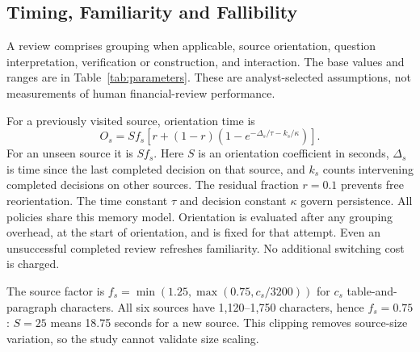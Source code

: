 \documentclass[a4paper,twoside]{article}
\begin{document}
\subsection{Timing, Familiarity and Fallibility}
A review comprises grouping when applicable, source orientation, question interpretation, verification or construction, and interaction. The base values and ranges are in Table~\ref{tab:parameters}. These are analyst-selected assumptions, not measurements of human financial-review performance.

For a previously visited source, orientation time is
\begin{equation}
 O_s = S f_s \left[r+(1-r)\left(1-e^{-\Delta_s/\tau-k_s/\kappa}\right)\right].
 \label{eq:orientation}
\end{equation}
For an unseen source it is $S f_s$. Here $S$ is an orientation coefficient in seconds, $\Delta_s$ is time since the last completed decision on that source, and $k_s$ counts intervening completed decisions on other sources. The residual fraction $r=0.1$ prevents free reorientation. The time constant $\tau$ and decision constant $\kappa$ govern persistence. All policies share this memory model. Orientation is evaluated after any grouping overhead, at the start of orientation, and is fixed for that attempt. Even an unsuccessful completed review refreshes familiarity. No additional switching cost is charged.

The source factor is $f_s=\min(1.25,\max(0.75,c_s/3200))$ for $c_s$ table-and-paragraph characters. All six sources have 1,120--1,750 characters, hence $f_s=0.75$: $S=25$ means 18.75 seconds for a new source. This clipping removes source-size variation, so the study cannot validate size scaling.
\end{document}
